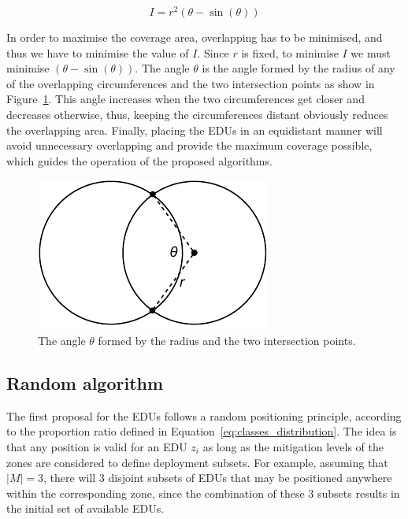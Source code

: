 \begin{refsection}
\begin{equation}
  I = r^2(\theta - \sin(\theta))
  \label{eq:overlapping_area}
\end{equation}

In order to maximise the coverage area, overlapping has to be minimised, and thus we have to minimise the value of $I$. Since $r$ is fixed, to minimise $I$ we must minimise $(\theta - \sin(\theta))$. The angle $\theta$ is the angle formed by the radius of any of the overlapping circumferences and the two intersection points as show in Figure~\ref{fig:circle_intersection}. This angle increases when the two circumferences get closer and decreases otherwise, thus, keeping the circumferences distant obviously reduces the overlapping area. Finally, placing the EDUs in an equidistant manner will avoid unnecessary overlapping and provide the maximum coverage possible, which guides the operation of the proposed algorithms.

\begin{figure}[htbp]
  \centering
  \includegraphics{Chapters/2-EDUs/images/circumferences_overlapping.pdf}
  \caption{The angle $\theta$ formed by the radius and the two intersection points.}\label{fig:circle_intersection}
\end{figure}

\subsection {Random algorithm}

The first proposal for the EDUs follows a random positioning principle, according to the proportion ratio defined in Equation~\ref{eq:classes_distribution}. The idea is that any position is valid for an EDU $z_i$ as long as the mitigation levels of the zones are considered to define deployment subsets. For example, assuming that $|M|=3$, there will 3 disjoint subsets of EDUs that may be positioned anywhere within the corresponding zone, since the combination of these 3 subsets results in the initial set of available EDUs.


\end{refsection}
